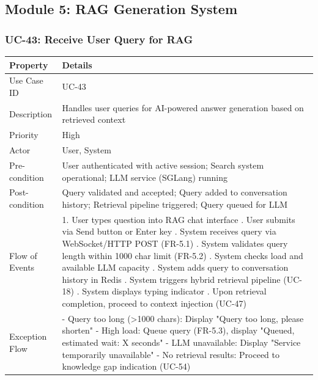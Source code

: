 \subsection*{Module 5: RAG Generation System}

\subsubsection*{UC-43: Receive User Query for RAG}

\begin{table}[H]
\small
\begin{tabularx}{\textwidth}{|p{}|X|}
\hline
\textbf{Property} & \textbf{Details} \\
\hline
Use Case ID & UC-43 \\
\hline
Description & Handles user queries for AI-powered answer generation based on retrieved context \\
\hline
Priority & High \\
\hline
Actor & User, System \\
\hline
Pre-condition & User authenticated with active session; Search system operational; LLM service (SGLang) running \\
\hline
Post-condition & Query validated and accepted; Query added to conversation history; Retrieval pipeline triggered; Query queued for LLM \\
\hline
Flow of Events & 1. User types question into RAG chat interface \newline 2. User submits via Send button or Enter key \newline 3. System receives query via WebSocket/HTTP POST (FR-5.1) \newline 4. System validates query length within 1000 char limit (FR-5.2) \newline 5. System checks load and available LLM capacity \newline 6. System adds query to conversation history in Redis \newline 7. System triggers hybrid retrieval pipeline (UC-18) \newline 8. System displays typing indicator \newline 9. Upon retrieval completion, proceed to context injection (UC-47) \\
\hline
Exception Flow & - Query too long (>1000 chars): Display "Query too long, please shorten" \newline - High load: Queue query (FR-5.3), display "Queued, estimated wait: X seconds" \newline - LLM unavailable: Display "Service temporarily unavailable" \newline - No retrieval results: Proceed to knowledge gap indication (UC-54) \\
\hline
\end{tabularx}
\end{table}

